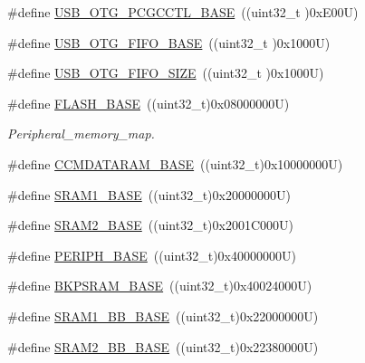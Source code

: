 \begin{DoxyCompactItemize}
\item 
\#define \hyperlink{group___peripheral__registers__structures_gaa9766975aca084c257730879568bc7cf}{U\+S\+B\+\_\+\+O\+T\+G\+\_\+\+P\+C\+G\+C\+C\+T\+L\+\_\+\+B\+A\+SE}~((uint32\+\_\+t )0x\+E00\+U)
\item 
\#define \hyperlink{group___peripheral__registers__structures_gace340350802904868673f0e839c4fa04}{U\+S\+B\+\_\+\+O\+T\+G\+\_\+\+F\+I\+F\+O\+\_\+\+B\+A\+SE}~((uint32\+\_\+t )0x1000\+U)
\item 
\#define \hyperlink{group___peripheral__registers__structures_ga8781c4b2406c740d9fe540737a6a0188}{U\+S\+B\+\_\+\+O\+T\+G\+\_\+\+F\+I\+F\+O\+\_\+\+S\+I\+ZE}~((uint32\+\_\+t )0x1000\+U)
\item 
\#define \hyperlink{group___peripheral__registers__structures_ga23a9099a5f8fc9c6e253c0eecb2be8db}{F\+L\+A\+S\+H\+\_\+\+B\+A\+SE}~((uint32\+\_\+t)0x08000000\+U)
\begin{DoxyCompactList}\small\item\em Peripheral\+\_\+memory\+\_\+map. \end{DoxyCompactList}\item 
\#define \hyperlink{group___peripheral__registers__structures_gabea1f1810ebeac402164b42ab54bcdf9}{C\+C\+M\+D\+A\+T\+A\+R\+A\+M\+\_\+\+B\+A\+SE}~((uint32\+\_\+t)0x10000000\+U)
\item 
\#define \hyperlink{group___peripheral__registers__structures_ga7d0fbfb8894012dbbb96754b95e562cd}{S\+R\+A\+M1\+\_\+\+B\+A\+SE}~((uint32\+\_\+t)0x20000000\+U)
\item 
\#define \hyperlink{group___peripheral__registers__structures_gadbb42a3d0a8a90a79d2146e4014241b1}{S\+R\+A\+M2\+\_\+\+B\+A\+SE}~((uint32\+\_\+t)0x2001\+C000\+U)
\item 
\#define \hyperlink{group___peripheral__registers__structures_ga9171f49478fa86d932f89e78e73b88b0}{P\+E\+R\+I\+P\+H\+\_\+\+B\+A\+SE}~((uint32\+\_\+t)0x40000000\+U)
\item 
\#define \hyperlink{group___peripheral__registers__structures_ga52e57051bdf8909222b36e5408a48f32}{B\+K\+P\+S\+R\+A\+M\+\_\+\+B\+A\+SE}~((uint32\+\_\+t)0x40024000\+U)
\item 
\#define \hyperlink{group___peripheral__registers__structures_gac4c4f61082e4b168f29d9cf97dc3ca5c}{S\+R\+A\+M1\+\_\+\+B\+B\+\_\+\+B\+A\+SE}~((uint32\+\_\+t)0x22000000\+U)
\item 
\#define \hyperlink{group___peripheral__registers__structures_gac33cb6edadf184ab9860d77089503922}{S\+R\+A\+M2\+\_\+\+B\+B\+\_\+\+B\+A\+SE}~((uint32\+\_\+t)0x22380000\+U)

\end{DoxyCompactItemize}
